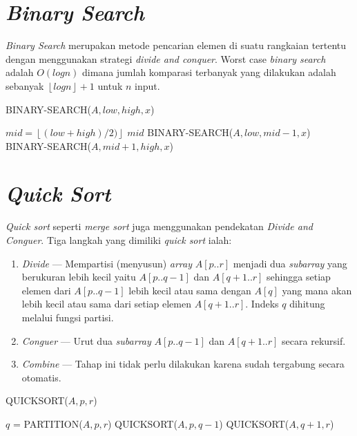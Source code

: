 \section{\textit{Binary Search}}

\textit{Binary Search} merupakan metode pencarian elemen di suatu rangkaian tertentu dengan menggunakan strategi \textit{divide and conquer}. Worst case \textit{binary search} adalah $O(log n)$ dimana jumlah komparasi terbanyak yang dilakukan adalah sebanyak $\left\lfloor log n \right\rfloor + 1$ untuk $n$ input.

\begin{algorithm}[H]
	\caption{BINARY-SEARCH($A,low,high,x$)}
	\begin{algorithmic}[1]
		\ELSE
			\STATE $mid = \left\lfloor(low+high)/2)\right\rfloor$
				\RETURN $mid$
				\RETURN BINARY-SEARCH($A,low,mid-1,x$) 
			\ELSE
				\RETURN BINARY-SEARCH($A,mid+1,high,x$)
			\ENDIF
		\ENDIF
	\end{algorithmic}
\end{algorithm}



\section{\textit{Quick Sort}}

\textit{Quick sort} seperti \textit{merge sort} juga menggunakan pendekatan \textit{Divide and Conguer}. Tiga langkah yang dimiliki \textit{quick sort} ialah:
\begin{enumerate}
	\item \textit{Divide} --- Mempartisi (menyusun) \textit{array} $A[p..r]$ menjadi dua \textit{subarray} yang berukuran lebih kecil yaitu $A[p..q-1]$ dan $A[q+1..r]$ sehingga setiap elemen dari $A[p..q-1]$ lebih kecil atau sama dengan $A[q]$ yang mana akan lebih kecil atau sama dari setiap elemen $A[q+1..r]$. Indeks $q$ dihitung melalui fungsi partisi.
	\item \textit{Conguer} --- Urut dua \textit{subarray} $A[p..q-1]$ dan $A[q+1..r]$ secara rekursif.
	\item \textit{Combine} --- Tahap ini tidak perlu dilakukan karena sudah tergabung secara otomatis.
\end{enumerate}

\begin{algorithm}[H]
	\caption{QUICKSORT($A,p,r$)}
	\begin{algorithmic}[1]
			\STATE $q$ = PARTITION($A,p,r$)
			\STATE QUICKSORT($A,p,q-1$)
			\STATE QUICKSORT($A,q+1,r$)
		\ENDIF
	\end{algorithmic}
\end{algorithm}

